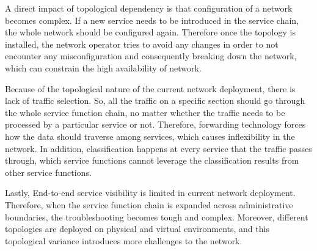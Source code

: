 A direct impact of topological dependency is that configuration of a network becomes complex. If a new service needs to be introduced in the service chain, the whole network should be configured again. Therefore once the topology is installed, the network operator tries to avoid any changes in order to not encounter any misconfiguration and consequently breaking down the network, which can constrain the high availability of network.

Because of the topological nature of the current network deployment, there is lack of traffic selection. So, all the traffic on a specific section should go through the whole service function chain, no matter whether the traffic needs to be processed by a particular service or not. Therefore, forwarding technology forces how the data should  traverse among services, which causes inflexibility in the network. In addition, classification happens at every service that the traffic passes through, which service functions cannot leverage the classification results from other service functions. 

Lastly, End-to-end service visibility is limited in current network deployment. Therefore, when the service function chain is expanded across administrative boundaries, the troubleshooting becomes tough and complex. Moreover, different topologies are deployed on physical and virtual environments, and this topological variance introduces more challenges to the network.

\clearpage
